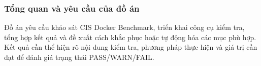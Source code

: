 \subsubsection{Tổng quan và yêu cầu của đồ án}\label{tong-quan-va-yeu-cau-cua-do-an}

Đồ án yêu cầu khảo sát CIS Docker Benchmark, triển khai công cụ kiểm tra, tổng hợp kết quả và đề xuất cách khắc phục hoặc tự động hóa các mục phù hợp. Kết quả cần thể hiện rõ nội dung kiểm tra, phương pháp thực hiện và giá trị cần đạt để đánh giá trạng thái PASS/WARN/FAIL.
